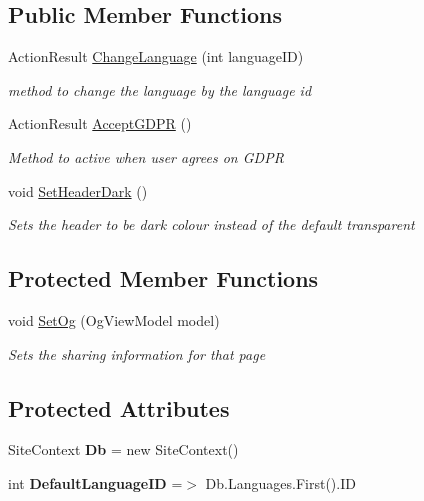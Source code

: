 \subsection*{Public Member Functions}
\begin{DoxyCompactItemize}
\item 
Action\+Result \mbox{\hyperlink{class_ox_tots_1_1_controllers_1_1_base_controller_a7e272bc100035579372cc08898caf847}{Change\+Language}} (int language\+ID)
\begin{DoxyCompactList}\small\item\em method to change the language by the language id \end{DoxyCompactList}\item 
Action\+Result \mbox{\hyperlink{class_ox_tots_1_1_controllers_1_1_base_controller_a043816d5d163e0cd1f2e4f56b515cc0a}{Accept\+G\+D\+PR}} ()
\begin{DoxyCompactList}\small\item\em Method to active when user agrees on G\+D\+PR \end{DoxyCompactList}\item 
void \mbox{\hyperlink{class_ox_tots_1_1_controllers_1_1_base_controller_ac4aff41c73d7990af15191f0d3cfc56d}{Set\+Header\+Dark}} ()
\begin{DoxyCompactList}\small\item\em Sets the header to be dark colour instead of the default transparent \end{DoxyCompactList}\end{DoxyCompactItemize}
\subsection*{Protected Member Functions}
\begin{DoxyCompactItemize}
\item 
void \mbox{\hyperlink{class_ox_tots_1_1_controllers_1_1_base_controller_a31641ef37a646ae083784a225dc9736a}{Set\+Og}} (Og\+View\+Model model)
\begin{DoxyCompactList}\small\item\em Sets the sharing information for that page \end{DoxyCompactList}\end{DoxyCompactItemize}
\subsection*{Protected Attributes}
\begin{DoxyCompactItemize}
\item 
\mbox{\label{class_ox_tots_1_1_controllers_1_1_base_controller_a8e7a155672c62ff211838f9886cb0fe9}} 
Site\+Context {\bfseries Db} = new Site\+Context()
\item 
\mbox{\label{class_ox_tots_1_1_controllers_1_1_base_controller_a88bb01f1fc9b0447ce3f905e581a000b}} 
int {\bfseries Default\+Language\+ID} =$>$ Db.\+Languages.\+First().ID
\end{DoxyCompactItemize}
